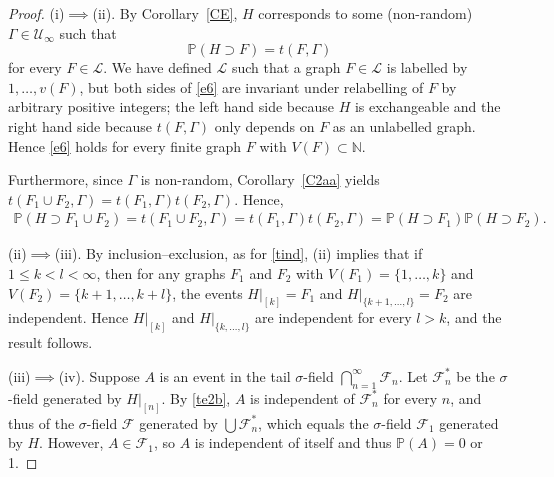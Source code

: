 \documentclass[11pt,reqno,tbtags]{amsart}
\numberwithin{equation}{section}
\theoremstyle{definition}
\theoremstyle{remark}
\newcommand{\refC}[1]{Corollary~\ref{#1}}
\newcommand\set[1]{\ensuremath{\{#1\}}}
\newcommand\bbN{\mathbb N}
\renewcommand\P{\operatorname{\mathbb P{}}}
\newcommand\gG{\Gamma}
\newcommand\gs{\sigma}
\newcommand\cF{\mathcal F}
\newcommand\cL{{\mathcal L}}
\newcommand\cU{{\mathcal U}}
\renewcommand{\=}{:=}
\newcommand\lhs{left hand side}
\newcommand\rhs{right hand side}
\newcommand{\cuoo}{\cU_\infty}
\newcommand{\rest}[1]{|_{[#1]}}
\newcommand{\restx}[1]{|_{#1}}
\newcommand{\exch}{exchangeable}
\begin{document}
\begin{proof}
  (i)$\implies$(ii).
By \refC{CE}, $H$ corresponds to some (non-random) $\gG\in\cuoo$ such
that
\begin{equation}
  \label{e6}
\P(H\supset F)=t(F,\gG)
\end{equation}
for every $F\in\cL$. We have defined $\cL$ such that a graph $F\in\cL$
is labelled by $1,\dots,v(F)$, but both sides of \eqref{e6} are
invariant under relabelling of $F$ by arbitrary positive integers; the
\lhs{} because $H$ is \exch{} and the \rhs{} because $t(F,\gG)$ only
depends on $F$ as an unlabelled graph. Hence \eqref{e6} holds for
every finite graph $F$ with $V(F)\subset\bbN$.

Furthermore, since $\gG$ is non-random, \refC{C2aa} yields 
$t(F_1\cup F_2,\gG)=t(F_1,\gG)t(F_2,\gG)$. Hence,
\begin{equation*}
  \begin{split}
\P(H\supset F_1\cup F_2)=
t(F_1\cup F_2,\gG)
=t(F_1,\gG)t(F_2,\gG)
=\P(H\supset F_1)\P(H\supset F_2).
  \end{split}
\end{equation*}

  (ii)$\implies$(iii).
By inclusion--exclusion, as for \eqref{tind}, 
(ii) implies that 
if $1\le k < l<\infty$, then 
for any graphs $F_1$ and $F_2$ with 
$V(F_1)=\set{1,\dots,k}$ and $V(F_2)=\set{k+1,\dots,k+l}$,
the events $H\rest k=F_1$ and $H\restx{\set{k+1,\dots,l}} =F_2$ 
are independent.
Hence $H\rest k$ and $H\restx{\set{k,\dots,l}}$ are independent for
every $l>k$, and the result follows.

  (iii)$\implies$(iv).
Suppose $A$ is an event in the tail $\gs$-field
  $\bigcap_{n=1}^\infty \cF_n$.
Let $\cF^*_n$ be the $\gs$-field generated by $H\rest n$. By
\ref{te2b}, $A$ is independent of $\cF^*_n$ for every $n$, and thus of
the $\gs$-field $\cF$ generated by $\bigcup\cF^*_n$, which equals the
$\gs$-field $\cF_1$ generated by $H$. However, $A\in\cF_1$, so $A$ is
independent of itself and thus $\P(A)=0$ or 1.


\end{proof}
\end{document}
